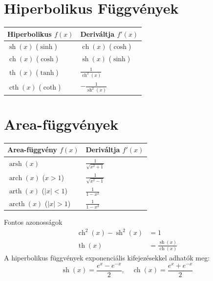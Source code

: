 \documentclass[10pt,a4paper,twocolumn]{article}
\begin{document}
\section{Hiperbolikus Függvények}

\begin{center}
\small
\begin{tabular}{ll}
\toprule
\textbf{Hiperbolikus $f(x)$} & \textbf{Deriváltja $f'(x)$} \\
\midrule
$\operatorname{sh}(x)$ ($\sinh$) & $\operatorname{ch}(x)$ ($\cosh$) \\
$\operatorname{ch}(x)$ ($\cosh$) & $\operatorname{sh}(x)$ ($\sinh$) \\
$\operatorname{th}(x)$ ($\tanh$) & $\frac{1}{\operatorname{ch}^2(x)}$ \\
$\operatorname{cth}(x)$ ($\coth$) & $-\frac{1}{\operatorname{sh}^2(x)}$ \\
\bottomrule
\end{tabular}
\end{center}
\vspace{-1em}

\section{Area-függvények}

\begin{center}
\small
\begin{tabular}{ll}
\toprule
\textbf{Area-függvény $f(x)$} & \textbf{Deriváltja $f'(x)$} \\
\midrule
$\operatorname{arsh}(x)$ & $\frac{1}{\sqrt{x^2+1}}$ \\
$\operatorname{arch}(x)$ ($x>1$) & $\frac{1}{\sqrt{x^2-1}}$ \\
$\operatorname{arth}(x)$ ($|x|<1$) & $\frac{1}{1-x^2}$ \\
$\operatorname{arcth}(x)$ ($|x|>1$) & $\frac{1}{1-x^2}$ \\
\bottomrule
\end{tabular}
\end{center}

\begin{fogalombox}{Fontos azonosságok}
\begin{align*}
    \operatorname{ch}^2(x) - \operatorname{sh}^2(x) &= 1 \\
    \operatorname{th}(x) &= \frac{\operatorname{sh}(x)}{\operatorname{ch}(x)}
\end{align*}
A hiperbolikus függvények exponenciális kifejezésekkel adhatók meg:
\[ \operatorname{sh}(x) = \frac{e^x - e^{-x}}{2}, \quad \operatorname{ch}(x) = \frac{e^x + e^{-x}}{2} \]
\end{fogalombox}
\end{document}
